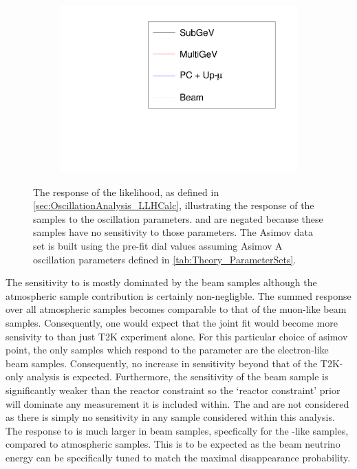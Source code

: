 \begin{figure}[h]
\begin{subfigure}[t]{0.5\textwidth}
    \includegraphics[width=\textwidth, trim={0mm 0mm 0mm 0mm}, clip,page=3]{Figures/OA/LLHScans_Osc.pdf}
  \end{subfigure}
  \caption{The response of the likelihood, as defined in \autoref{sec:OscillationAnalysis_LLHCalc}, illustrating the response of the samples to the oscillation parameters. \delmsqsol and \sinsqsol are negated because these samples have no sensitivity to those parameters. The Asimov data set is built using the pre-fit dial values assuming Asimov A oscillation parameters defined in \autoref{tab:Theory_ParameterSets}.}
  \label{fig:OscillationAnalysis_LLHScanOscPars}
\end{figure}

The sensitivity to \sinsqatm is mostly dominated by the beam samples although the atmospheric sample contribution is certainly non-negligble. The summed response over all atmospheric samples becomes comparable to that of the muon-like beam samples. Consequently, one would expect that the joint fit would become more sensivity to \sinsqatm than just T2K experiment alone. For this particular choice of asimov point, the only samples which respond to the \sinsqreac parameter are the electron-like beam samples. Consequently, no increase in sensitivity beyond that of the T2K-only analysis is expected. Furthermore, the sensitivity of the beam sample is significantly weaker than the reactor constraint so the `reactor constraint' prior will dominate any measurement it is included within. The \delmsqsol and \sinsqsol are not considered as there is simply no sensitivity in any sample considered within this analysis. The response to \delmsqatm is much larger in beam samples, specfically for the \quickmath{\mu}-like samples, compared to atmospheric samples. This is to be expected as the beam neutrino energy can be specifically tuned to match the maximal disappearance probability. %
  
